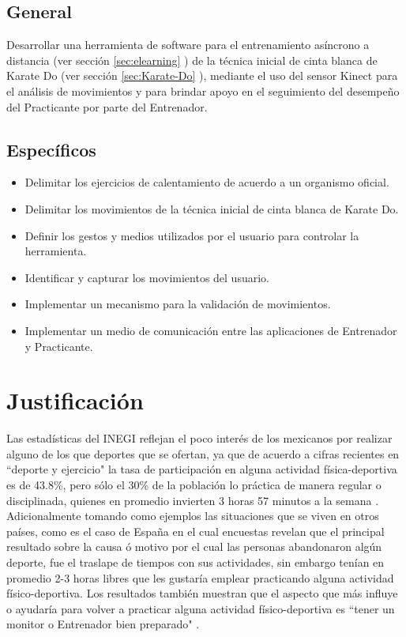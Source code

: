 \subsection{General}

Desarrollar una herramienta de software para el entrenamiento asíncrono a distancia (ver sección \ref{sec:elearning} ) de la técnica inicial de cinta blanca de Karate Do (ver sección \ref{sec:Karate-Do} ), mediante el uso del sensor Kinect para el análisis de movimientos y para brindar apoyo en el seguimiento del desempeño del Practicante por parte del Entrenador.

\subsection{Específicos}
\begin{itemize}
	\item Delimitar los ejercicios de calentamiento de acuerdo a un organismo oficial.
	\item Delimitar los movimientos de la técnica inicial de cinta blanca de Karate Do.
	\item Definir los gestos y medios utilizados por el usuario para controlar la herramienta.
	\item Identificar y capturar  los movimientos del usuario.
	\item Implementar un mecanismo para la validación de movimientos.
	\item Implementar un medio de comunicación entre las aplicaciones de Entrenador y Practicante.
\end{itemize}
\section{Justificación}
Las estadísticas del INEGI reflejan el poco interés de los  mexicanos por realizar alguno de los que deportes que se ofertan, ya que de acuerdo a cifras recientes en ``deporte y ejercicio"  la tasa de participación en alguna actividad física-deportiva es de 43.8\%,  pero sólo el 30\% de la población lo práctica de manera regular o disciplinada, quienes en promedio invierten 3 horas 57 minutos a la semana \cite{INEGI}. Adicionalmente tomando como ejemplos las situaciones que se viven en otros países, como es el caso de España en el cual encuestas revelan que el principal resultado sobre la causa ó motivo por el cual las personas abandonaron algún deporte, fue el traslape de tiempos con sus actividades, sin embargo tenían en promedio 2-3 horas libres que les gustaría emplear practicando alguna actividad físico-deportiva. Los resultados también muestran que el aspecto que más influye o ayudaría para volver a practicar alguna actividad físico-deportiva es ``tener un monitor o Entrenador bien preparado" \cite{Efdeportes}.\\


